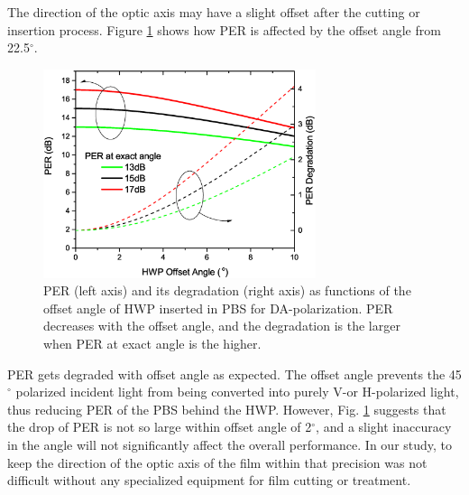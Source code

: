 \documentclass[letterpaper, 10pt]{article}
\begin{document}
The direction of the optic axis may have a slight offset after the cutting  or  insertion process.
Figure \ref{fig:angle_offset} shows how PER is affected by the offset angle from 22.5$^\circ$.
\begin{figure}
  \centering
  \includegraphics[width=8cm]{./offset_angle}
  \caption{PER (left axis) and its degradation (right axis) as functions of the offset angle of HWP inserted in PBS for DA-polarization. PER decreases with the offset angle, and the degradation is the larger when PER at exact angle is the higher.}
  \label{fig:angle_offset}
\end{figure}
PER gets degraded with offset angle as expected.
The offset angle prevents the 45$^\circ$ polarized incident light from being converted into purely V-or H-polarized light, thus reducing PER of the PBS behind the HWP.
However, Fig. \ref{fig:angle_offset} suggests that the drop of PER is not so large within  offset angle of 2$^\circ$, and  a slight inaccuracy in the angle  will not significantly affect the overall performance.
In our study, to keep the direction of the optic axis of the film within that precision was not difficult without any specialized equipment for film cutting or treatment.
\end{document}
